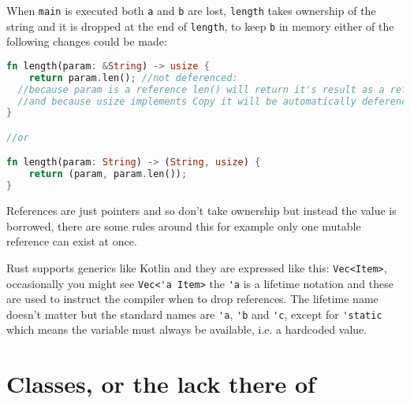 \documentclass[a4paper,11pt]{article}
\begin{document}
When \lstinline{main} is executed both \lstinline{a} and \lstinline{b} are lost, \lstinline{length} takes ownership of the string and it is dropped at the end of \lstinline{length}, to keep \lstinline{b} in memory either of the following changes could be made:
\begin{lstlisting}[language=Rust,frame=single]
fn length(param: &String) -> usize {
	return param.len(); //not deferenced:
  //because param is a reference len() will return it's result as a reference
  //and because usize implements Copy it will be automatically deferenced
}

//or

fn length(param: String) -> (String, usize) {
	return (param, param.len()); 
}
\end{lstlisting}

References are just pointers and so don't take ownership but instead the value is borrowed, there are some rules around this for example only one mutable reference can exist at once.

Rust supports generics like Kotlin and they are expressed like this: \lstinline{Vec<Item>}, occasionally you might see \lstinline{Vec<'a Item>} the \lstinline{'a} is a lifetime notation and these are used to instruct the compiler when to drop references. The lifetime name doesn't matter but the standard names are \lstinline{'a}, \lstinline{'b} and \lstinline{'c}, except for \lstinline{'static} which means the variable must always be available, i.e. a hardcoded value.

\newpage
\section{Classes, or the lack there of}
\end{document}
